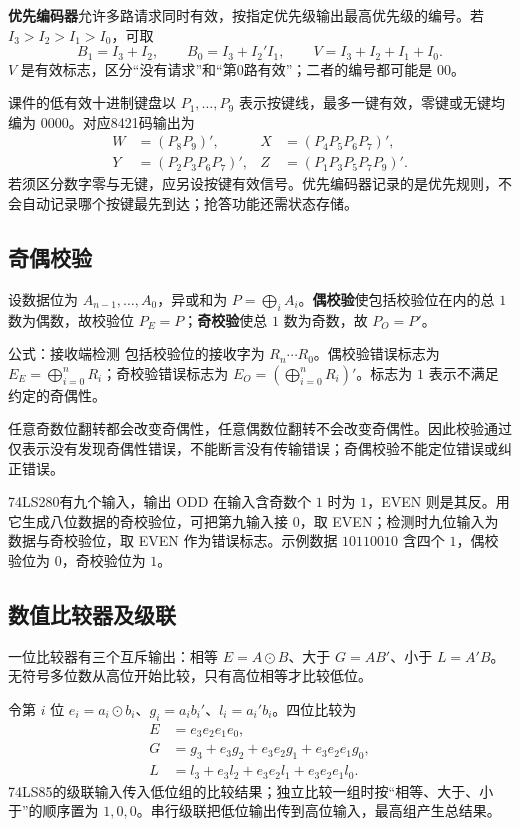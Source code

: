 \documentclass[UTF8,fontset=none,zihao=-4,a4paper]{ctexart}
\newcommand{\term}[1]{\textbf{#1}}
\begin{document}
\term{优先编码器}允许多路请求同时有效，按指定优先级输出最高优先级的编号。若 $I_3>I_2>I_1>I_0$，可取
\[
B_1=I_3+I_2,\qquad B_0=I_3+I_2'I_1,\qquad
V=I_3+I_2+I_1+I_0.
\]
$V$ 是有效标志，区分“没有请求”和“第0路有效”；二者的编号都可能是 $00$。

课件的低有效十进制键盘以 $P_1,\ldots,P_9$ 表示按键线，最多一键有效，零键或无键均编为 $0000$。对应8421码输出为
\begin{align*}
W&=(P_8P_9)',&X&=(P_4P_5P_6P_7)',\\
Y&=(P_2P_3P_6P_7)',&Z&=(P_1P_3P_5P_7P_9)'.
\end{align*}
若须区分数字零与无键，应另设按键有效信号。优先编码器记录的是优先规则，不会自动记录哪个按键最先到达；抢答功能还需状态存储。

\subsection{奇偶校验}
设数据位为 $A_{n-1},\ldots,A_0$，异或和为 $P=\bigoplus_i A_i$。\term{偶校验}使包括校验位在内的总 $1$ 数为偶数，故校验位 $P_E=P$；\term{奇校验}使总 $1$ 数为奇数，故 $P_O=P'$。
\begin{infobox}{公式：接收端检测}
包括校验位的接收字为 $R_n\cdots R_0$。偶校验错误标志为 $E_E=\bigoplus_{i=0}^{n}R_i$；奇校验错误标志为 $E_O=(\bigoplus_{i=0}^{n}R_i)'$。标志为 $1$ 表示不满足约定的奇偶性。
\end{infobox}
任意奇数位翻转都会改变奇偶性，任意偶数位翻转不会改变奇偶性。因此校验通过仅表示没有发现奇偶性错误，不能断言没有传输错误；奇偶校验不能定位错误或纠正错误。

74LS280有九个输入，输出 ODD 在输入含奇数个 $1$ 时为 $1$，EVEN 则是其反。用它生成八位数据的奇校验位，可把第九输入接 $0$，取 EVEN；检测时九位输入为数据与奇校验位，取 EVEN 作为错误标志。示例数据 $10110010$ 含四个 $1$，偶校验位为 $0$，奇校验位为 $1$。

\subsection{数值比较器及级联}
一位比较器有三个互斥输出：相等 $E=A\odot B$、大于 $G=AB'$、小于 $L=A'B$。无符号多位数从高位开始比较，只有高位相等才比较低位。

令第 $i$ 位 $e_i=a_i\odot b_i$、$g_i=a_ib_i'$、$l_i=a_i'b_i$。四位比较为
\begin{align*}
E&=e_3e_2e_1e_0,\\
G&=g_3+e_3g_2+e_3e_2g_1+e_3e_2e_1g_0,\\
L&=l_3+e_3l_2+e_3e_2l_1+e_3e_2e_1l_0.
\end{align*}
74LS85的级联输入传入低位组的比较结果；独立比较一组时按“相等、大于、小于”的顺序置为 $1,0,0$。串行级联把低位输出传到高位输入，最高组产生总结果。
\end{document}

